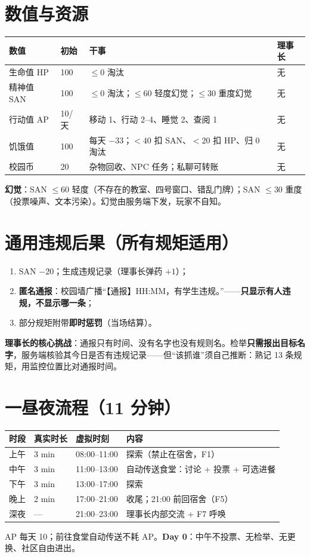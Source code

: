\documentclass[UTF8, fontset=none, 11pt]{ctexart}
\begin{document}
\section{数值与资源}
\begin{center}
\begin{tabular}{llll}
\toprule
数值 & 初始 & 干事 & 理事长 \\
\midrule
生命值 HP & 100 & $\le 0$ 淘汰 & 无 \\
精神值 SAN & 100 & $\le 0$ 淘汰；$\le 60$ 轻度幻觉；$\le 30$ 重度幻觉 & 无 \\
行动值 AP & 10/天 & 移动 1、行动 2--4、睡觉 2、查阅 1 & 无 \\
饥饿值 & 100 & 每天 $-33$；$<40$ 扣 SAN、$<20$ 扣 HP、归 0 淘汰 & 无 \\
校园币 & 20 & 杂物回收、NPC 任务；私聊可转账 & 无 \\
\bottomrule
\end{tabular}
\end{center}

\textbf{幻觉}：SAN $\le 60$ 轻度（不存在的教室、四号窗口、错乱门牌）；SAN $\le 30$ 重度（投票噪声、文本污染）。幻觉由服务端下发，玩家不自知。

\section{通用违规后果（所有规矩适用）}
\begin{enumerate}
  \item SAN $-20$；生成违规记录（理事长弹药 $+1$）；
  \item \textbf{匿名通报}：校园墙广播``【通报】HH:MM，有学生违规。''——\textbf{只显示有人违规，不显示哪一条}；
  \item 部分规矩附带\textbf{即时惩罚}（当场结算）。
\end{enumerate}
\textbf{理事长的核心挑战}：通报只有时间、没有名字也没有规则名。检举\textbf{只需报出目标名字}，服务端核验其今日是否有违规记录——但``该抓谁''须自己推断：熟记 13 条规矩，用监控位置比对通报时间。

\section{一昼夜流程（11 分钟）}
\begin{center}
\begin{tabular}{llll}
\toprule
时段 & 真实时长 & 虚拟时刻 & 内容 \\
\midrule
上午 & 3 min & 08:00--11:00 & 探索（禁止在宿舍，F1） \\
中午 & 3 min & 11:00--13:00 & 自动传送食堂：讨论 + 投票 + 可选进餐 \\
下午 & 3 min & 13:00--17:00 & 探索 \\
晚上 & 2 min & 17:00--21:00 & 收尾；21:00 前回宿舍（F5） \\
深夜 & --- & 21:00--23:00 & 理事长内部交流 + F7 呼唤 \\
\bottomrule
\end{tabular}
\end{center}
AP 每天 10；前往食堂自动传送不耗 AP。\textbf{Day 0}：中午不投票、无检举、无更换、社区自由进出。
\end{document}
